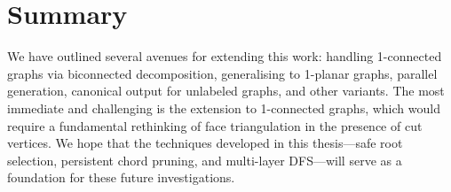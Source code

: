 \section{Summary}
\label{sec:future_summary}

We have outlined several avenues for extending this work: handling 1-connected graphs via biconnected decomposition, generalising to 1-planar graphs, parallel generation, canonical output for unlabeled graphs, and other variants. 
The most immediate and challenging is the extension to 1-connected graphs, which would require a fundamental rethinking of face triangulation in the presence of cut vertices. 
We hope that the techniques developed in this thesis—safe root selection, persistent chord pruning, and multi-layer DFS—will serve as a foundation for these future investigations.
